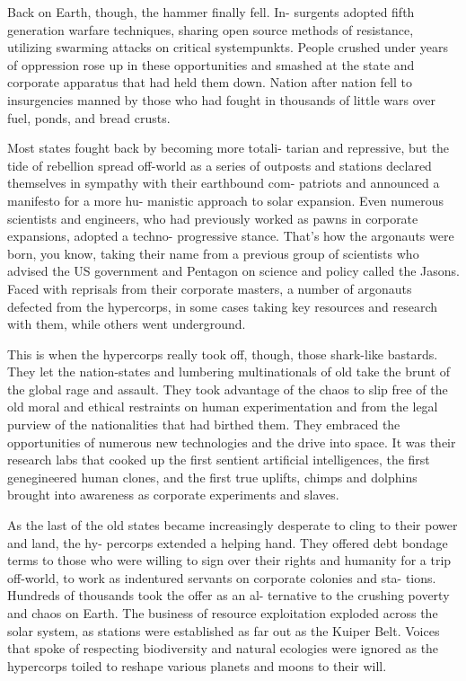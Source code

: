 Back on Earth, though, the hammer finally fell. In-
surgents adopted fifth generation warfare techniques, 
sharing open source methods of resistance, utilizing 
swarming attacks on critical systempunkts. People 
crushed under years of oppression rose up in these 
opportunities and smashed at the state and corporate 
apparatus that had held them down. Nation after 
nation fell to insurgencies manned by those who had 
fought in thousands of little wars over fuel, ponds, 
and bread crusts.

Most states fought back by becoming more totali-
tarian and repressive, but the tide of rebellion spread 
off-world as a series of outposts and stations declared 
themselves in sympathy with their earthbound com-
patriots and announced a manifesto for a more hu-
manistic approach to solar expansion. Even numerous 
scientists and engineers, who had previously worked 
as pawns in corporate expansions, adopted a techno-
progressive stance. That's how the argonauts were 
born, you know, taking their name from a previous 
group of scientists who advised the US government 
and Pentagon on science and policy called the Jasons. 
Faced with reprisals from their corporate masters, a 
number of argonauts defected from the hypercorps, 
in some cases taking key resources and research with 
them, while others went underground.

This is when the hypercorps really took off, though, 
those shark-like bastards. They let the nation-states 
and lumbering multinationals of old take the brunt 
of the global rage and assault. They took advantage 
of the chaos to slip free of the old moral and ethical 
restraints on human experimentation and from the 
legal purview of the nationalities that had birthed 
them. They embraced the opportunities of numerous 
new technologies and the drive into space. It was their 
research labs that cooked up the first sentient artificial 
intelligences, the first genegineered human clones, and 
the first true uplifts, chimps and dolphins brought 
into awareness as corporate experiments and slaves.

As the last of the old states became increasingly 
desperate to cling to their power and land, the hy-
percorps extended a helping hand. They offered debt 
bondage terms to those who were willing to sign over 
their rights and humanity for a trip off-world, to work 
as indentured servants on corporate colonies and sta-
tions. Hundreds of thousands took the offer as an al-
ternative to the crushing poverty and chaos on Earth. 
The business of resource exploitation exploded across 
the solar system, as stations were established as far 
out as the Kuiper Belt. Voices that spoke of respecting 
biodiversity and natural ecologies were ignored as 
the hypercorps toiled to reshape various planets and 
moons to their will.

